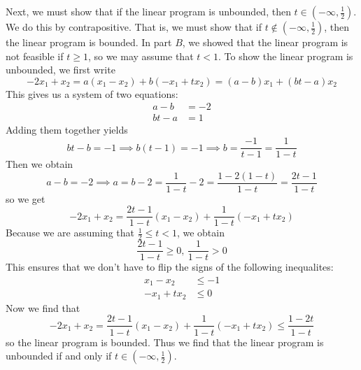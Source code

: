\documentclass[12pt]{article}
\begin{document}
Next, we must show that if the linear program is unbounded, then $t \in (-\infty, \frac{1}{2})$. We do this by contrapositive. That is, we must show that if $t \not \in (-\infty, \frac{1}{2})$, then the linear program is bounded. In part $B$, we showed that the linear program is not feasible if $t \geq 1$, so we may assume that $t < 1$. To show the linear program is unbounded, we first write
\[
-2x_1 + x_2 = a(x_1-x_2) + b(-x_1 + tx_2) = (a-b)x_1 + (bt - a)x_2
\] This gives us a system of two equations:
\begin{align*}
a-b &= -2\\
bt - a &= 1
\end{align*} Adding them together yields
\[
bt - b = -1 \implies b(t-1) = -1 \implies b = \frac{-1}{t-1} = \frac{1}{1-t}
\] Then we obtain
\[
a-b = -2 \implies a = b-2 = \frac{1}{1-t} - 2 = \frac{1-2(1-t)}{1-t} = \frac{2t -1}{1-t}
\] so we get
\[
-2x_1 + x_2 =  \frac{2t -1}{1-t}(x_1-x_2) + \frac{1}{1-t}(-x_1 + tx_2)
\] Because we are assuming that $\frac{1}{2} \leq t < 1$, we obtain
\[
\frac{2t-1}{1-t} \geq 0,\, \frac{1}{1-t} > 0
\] This ensures that we don't have to flip the signs of the following inequalites:
\begin{align*}
x_1 - x_2 &\leq -1\\
-x_1 + tx_2 &\leq 0
\end{align*} Now we find that
\[
-2x_1 + x_2 =  \frac{2t -1}{1-t}(x_1-x_2) + \frac{1}{1-t}(-x_1 + tx_2) \leq \frac{1-2t}{1-t}
\] so the linear program is bounded. Thus we find that the linear program is unbounded if and only if $t \in (-\infty,\frac{1}{2})$.
\end{document}
